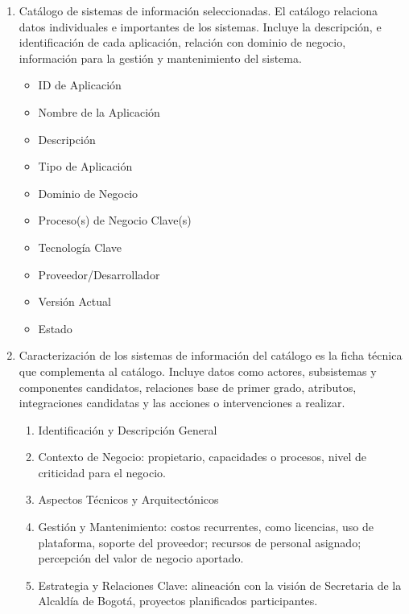 \documentclass[
	a4paper, %
	12pt, %
]{include/CSSullivanBusinessReport}
\def\tightlist{}
\begin{document}
\begin{enumerate}
\def\labelenumi{\arabic{enumi}.}
\tightlist
\item
  Catálogo de sistemas de información seleccionadas. El catálogo
  relaciona datos individuales e importantes de los sistemas. Incluye la
  descripción, e identificación de cada aplicación, relación con dominio
  de negocio, información para la gestión y mantenimiento del sistema.

  \begin{itemize}
  \tightlist
  \item
    ID de Aplicación
  \item
    Nombre de la Aplicación
  \item
    Descripción
  \item
    Tipo de Aplicación
  \item
    Dominio de Negocio
  \item
    Proceso(s) de Negocio Clave(s)
  \item
    Tecnología Clave
  \item
    Proveedor/Desarrollador
  \item
    Versión Actual
  \item
    Estado
  \end{itemize}
\item
  Caracterización de los sistemas de información del catálogo es la
  ficha técnica que complementa al catálogo. Incluye datos como actores,
  subsistemas y componentes candidatos, relaciones base de primer grado,
  atributos, integraciones candidatas y las acciones o intervenciones a
  realizar.

  \begin{enumerate}
  \def\labelenumii{\arabic{enumii}.}
  \tightlist
  \item
    Identificación y Descripción General
  \item
    Contexto de Negocio: propietario, capacidades o procesos, nivel de
    criticidad para el negocio.
  \item
    Aspectos Técnicos y Arquitectónicos
  \item
    Gestión y Mantenimiento: costos recurrentes, como licencias, uso de
    plataforma, soporte del proveedor; recursos de personal asignado;
    percepción del valor de negocio aportado.
  \item
    Estrategia y Relaciones Clave: alineación con la visión de
    Secretaria de la Alcaldía de Bogotá, proyectos planificados
    participantes.
  \end{enumerate}
\end{enumerate}
\end{document}
